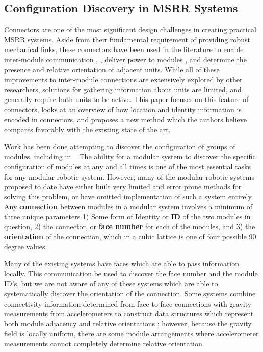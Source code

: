 \subsection{Configuration Discovery in MSRR Systems}
\label{ssec:RWconfiguration}
Connectors are one of the most significant design challenges in creating practical MSRR systems. Aside from their fundamental requirement of providing robust mechanical links, these connectors have been used in the literature to enable inter-module communication \cite{liedke2013collective}, \cite{TosunDaveyLiuYim-IROS2016}, deliver power to modules \cite{OptimalPowerSharing2016}, and determine the presence and relative orientation of adjacent units. While all of these improvements to inter-module connections are extensively explored by other researchers, solutions for gathering information about units are limited, and generally require both units to be active.  This paper focuses on this feature of connectors, looks at an overview of how location and identity information is encoded in connectors, and proposes a new method which the authors believe compares favorably with the existing state of the art.
	
Work has been done attempting to discover the configuration of groups of modules, including in ~\cite{park2008automatic}
The ability for a modular system to discover the specific configuration of modules at any and all times is one of the most essential tasks for any modular robotic system. However, many of the modular robotic systems proposed to date have either built very limited and error prone methods for solving this problem, or have omitted implementation of such a system entirely. Any \textbf{connection} between modules in a modular system involves a minimum of three unique parameters 1) Some form of Identity or \textbf{ID} of the two modules in question, 2) the connector, or \textbf{face number} for each of the modules, and 3) the \textbf{orientation} of the connection, which in a cubic lattice is one of four possible 90 degree values.

Many of the existing systems have faces which are able to pass information locally. This communication be used to discover the face number and the module ID's, but we are not aware of any of these systems which are able to systematically discover the orientation of the connection. Some systems combine connectivity information determined from face-to-face connections with gravity measurements from accelerometers to construct data structures which represent both module adjacency and relative orientations \cite{Soldercubes2016}; however, because the gravity field is locally uniform, there are some module arrangements where accelerometer measurements cannot completely determine relative orientation.

